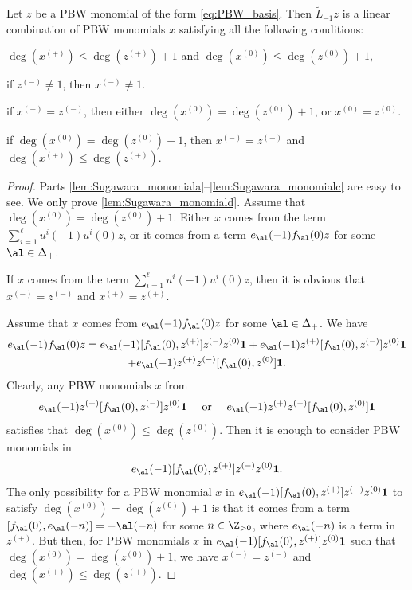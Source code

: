 \begin{lem}
\label{lem:Sugawara_monomial}
Let $z$ be a PBW monomial of the form \eqref{eq:PBW_basis}.
Then $\tilde L_{-1} z$
is a linear combination of PBW monomials
$x$ satisfying all the following conditions:
\begin{enumeratea}
\item\label{lem:Sugawara_monomiala}
$\deg(x^{(+)}) \leq \deg(z^{(+)})+1$ and $\deg(x^{(0)}) \leq \deg(z^{(0)})+1$,
\item\label{lem:Sugawara_monomialb}
if $z^{(-)}\neq 1$, then $x^{(-)}\neq 1$.
\item\label{lem:Sugawara_monomialc}
if $x^{(-)}=z^{(-)}$, then either $\deg(x^{(0)}) =\deg(z^{(0)}) +1$, or $x^{(0)} = z^{(0)}$.
\item\label{lem:Sugawara_monomiald}
if $\deg(x^{(0)}) =\deg(z^{(0)}) +1$, then $x^{(-)}= z^{(-)}$ and $\deg(x^{(+)}) \leq \deg(z^{(+)})$.
\end{enumeratea}
\end{lem}
\begin{proof}
Parts \eqref{lem:Sugawara_monomiala}--\eqref{lem:Sugawara_monomialc} are easy to see. We only prove \eqref{lem:Sugawara_monomiald}. Assume that $\deg(x^{(0)}) =\deg(z^{(0)}) +1$.
Either $x$ comes from the term $\sum_{i=1}^{\ell} u^i(-1)u^i(0) z$,
or it comes from a term $e_{\al}(-1)f_{\al}(0)z$ for some $\al \in \Delta_+$.

If $x$ comes from the term $\sum_{i=1}^{\ell} u^i(-1)u^i(0) z$, then it is obvious that
$x^{(-)}= z^{(-)}$ and $x^{(+)} = z^{(+)}$.

Assume that $x$ comes from $e_{\al}(-1)f_{\al}(0)z$ for some $\al \in \Delta_+$.
We have
\begin{multline*}
e_{\al}(-1)f_{\al}(0)z = e_{\al}(-1) [f_{\al}(0), z^{(+)}]z^{(-)}z^{(0)}\mathbf{1} + e_{\al}(-1)z^{(+)}[f_{\al}(0), z^{(-)}]z^{(0)} \mathbf{1} \\
+ e_{\al}(-1)z^{(+)} z^{(-)}[f_{\al}(0),z^{(0)} ] \mathbf{1}.
\end{multline*}
Clearly, any PBW monomials $x$ from
\[
e_{\al}(-1)z^{(+)}[f_{\al}(0), z^{(-)}]z^{(0)} \mathbf{1} \quad \text{ or }
\quad e_{\al}(-1)z^{(+)} z^{(-)}[f_{\al}(0),z^{(0)} ] \mathbf{1}
\]
satisfies that $\deg(x^{(0)}) \leq \deg(z^{(0)})$. Then it is enough to consider PBW monomials in
\[
e_{\al}(-1) [f_{\al}(0), z^{(+)}]z^{(-)}z^{(0)}\mathbf{1}.
\]
The only possibility for a PBW monomial $x$ in $ e_{\al}(-1) [f_{\al}(0), z^{(+)}]z^{(-)}z^{(0)}\mathbf{1}$
to satisfy $\deg(x^{(0)}) =\deg(z^{(0)}) +1$ is that it comes from a term
$ [f_{\al}(0), e_{\al}(-n)]= - \al(-n)$ for some $n \in \Z_{>0}$, where
$e_{\al}(-n)$ is a term in $z^{(+)}$.
But then, for PBW monomials $x$ in
$ e_{\al}(-1)[f_{\al}(0), z^{(+)}]z^{(0)}\mathbf{1}$
such that $\deg(x^{(0)}) =\deg(z^{(0)}) +1$,
we have $x^{(-)}=z^{(-)}$ and $\deg(x^{(+)}) \leq \deg(z^{(+)})$.
\end{proof}

